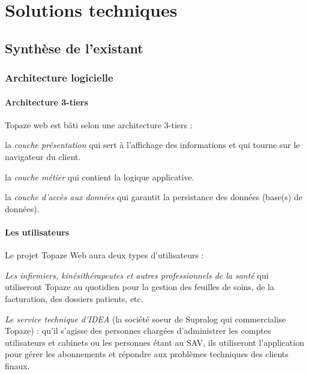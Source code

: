 \newpage
\section{Solutions techniques} %




\subsection{Synthèse de l'existant} %
\subsubsection{Architecture logicielle}
\label{sec:architecture}
\paragraph*{Architecture 3-tiers\\}
Topaze web est bâti selon une architecture 3-tiers : 
\begin{sitemize}
\item la \textit{couche présentation} qui sert à l'affichage des informations et qui tourne sur le navigateur du client.
\item la \textit{couche métier} qui contient la logique applicative.
\item la \textit{couche d'accès aux données} qui garantit la persistance des données (base(s) de données). 
\end{sitemize}

\paragraph*{Les utilisateurs\\}
Le projet Topaze Web aura deux types d'utilisateurs : 
\begin{sitemize}
\item \textit{Les infirmiers, kinésithérapeutes et autres professionnels de la santé} qui utiliseront Topaze au quotidien pour la gestion des feuilles de soins, de la facturation, des dossiers patients, etc. 
\item \textit{Le service technique d'IDEA} (la société soeur de Supralog qui commercialise Topaze) : qu’il s’agisse des personnes
chargées d’administrer les comptes utilisateurs et cabinets ou les personnes étant au SAV, ils
utiliseront l’application pour gérer les abonnements et répondre aux problèmes techniques des
clients finaux.
\end{sitemize}

